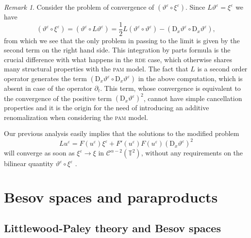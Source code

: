 \documentclass[11pt,a4paper]{article}
\newcommand{\mathD}{\mathrm{D}}
\theoremstyle{remark}
\newtheorem{remark}[theorem]{Remark}
\newcommand{\CC}{\ensuremath{\mathscr{C}}}
\begin{document}
\begin{remark}


Consider the problem of convergence of $( \vartheta^{\varepsilon} \circ
\xi^{\varepsilon} )$. Since $L  \vartheta^{\varepsilon} = \xi^{\varepsilon}$
we have
\[ ( \vartheta^{\varepsilon} \circ \xi^{\varepsilon} ) = (
   \vartheta^{\varepsilon} \circ L  \vartheta^{\varepsilon} ) = \frac{1}{2} L 
   ( \vartheta^{\varepsilon} \circ   \vartheta^{\varepsilon} ) - (
   \mathD_{x} \vartheta^{\varepsilon} \circ \mathD_{x}  
   \vartheta^{\varepsilon} ),
\]
from which we see that the only problem in passing to the limit is given by
the second term on the right hand side. This integration by parts formula is the crucial difference with what happens in the \textsc{rde} case, which otherwise shares many structural properties with the \textsc{pam} model. The fact that $L$ is a second order operator generates the term $(\mathD_{x} \vartheta^{\varepsilon} \circ \mathD_{x}  \vartheta^{\varepsilon} )$ in the above computation, which is absent in case of the operator $\partial_t$. This term, whose convergence is equivalent to the convergence of the positive term $(\mathD_x \vartheta^\varepsilon)^2$, cannot have simple cancellation properties and it is the origin for the need of introducing an additive renomalization when considering the \textsc{pam} model.

Our previous analysis easily implies  that the solutions to the modified
problem
\[
   L u^{\varepsilon} =F ( u^{\varepsilon} ) \xi^{\varepsilon} + F'( u^{\varepsilon} ) F (u^{\varepsilon} ) ( \mathD_{x} \vartheta^{\varepsilon}  )^2
\]
will converge as soon as $\xi^{\varepsilon} \rightarrow \xi$ in $\CC^{\alpha
-2} ( \mathbb{T}^{2} )$, without any requirements on the bilinear quantity $\vartheta^{\varepsilon} \circ
\xi^{\varepsilon}$ . 

\end{remark}





\appendix


\section{Besov spaces and paraproducts}\label{sec:para}

\subsection{Littlewood-Paley theory and Besov spaces}\label{sec:littlewood}
\end{document}

